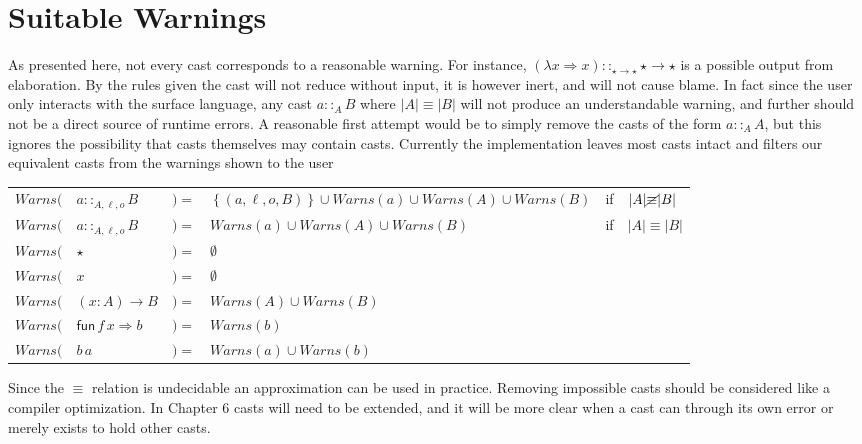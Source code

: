 
\section{Suitable Warnings}

As presented here, not every cast corresponds to a reasonable warning.
For instance, $\left(\lambda x\Rightarrow x\right)::_{\star\rightarrow\star}\star\rightarrow\star$
is a possible output from elaboration. By the rules given the cast
will not reduce without input, it is however inert, and will not cause
blame. In fact since the user only interacts with the surface language,
any cast $a::_{A}B$ where $|A|\equiv|B|$ will not produce an understandable
warning, and further should not be a direct source of runtime errors.
A reasonable first attempt would be to simply remove the casts of
the form $a::_{A}A$, but this ignores the possibility that casts
themselves may contain casts. Currently the implementation
leaves most casts intact and filters our equivalent casts from the
warnings shown to the user


\begin{tabular}{llllll}
$Warns($ & $a::_{A,\ensuremath{\ell},o}B$ & $)=$ & $\left\{ (a,\ensuremath{\ell},o,B)\right\} \cup Warns(a)\cup Warns(A)\cup Warns(B)$ & if & $|A|\cancel{\equiv}|B|$\tabularnewline
$Warns($ & $a::_{A,\ensuremath{\ell},o}B$ & $)=$ & $Warns(a)\cup Warns(A)\cup Warns(B)$ & if & $|A|\equiv|B|$\tabularnewline
$Warns($ & $\star$ & $)=$ & $\emptyset$ &  & \tabularnewline
$Warns($ & $x$ & $)=$ & $\emptyset$ &  & \tabularnewline
$Warns($ & $\left(x:A\right)\rightarrow B$ & $)=$ & $Warns(A)\cup Warns(B)$ &  & \tabularnewline
$Warns($ & $\mathsf{fun}\,f\,x\Rightarrow b$ & $)=$ & $Warns(b)$ &  & \tabularnewline
$Warns($ & $b\,a$ & $)=$ & $Warns(a)\cup Warns(b)$ &  & \tabularnewline
\end{tabular}

Since the $\equiv$ relation is undecidable an approximation can be
used in practice. Removing impossible casts should be considered like
a compiler optimization. In Chapter 6 casts will need to be extended,
and it will be more clear when a cast can through its own error or
merely exists to hold other casts.
